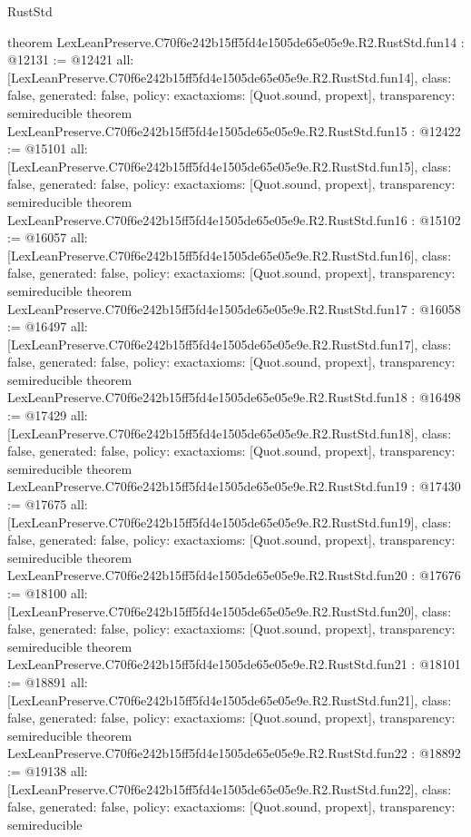 \begin{lexlean}{RustStd}
\begin{coremodule}
{}
theorem LexLeanPreserve.C70f6e242b15ff5fd4e1505de65e05e9e.R2.RustStd.fun14 : @12131 := @12421 {
  all: [LexLeanPreserve.C70f6e242b15ff5fd4e1505de65e05e9e.R2.RustStd.fun14],
  class: false,
  generated: false,
  policy: exact{axioms: [Quot.sound, propext]},
  transparency: semireducible
}
theorem LexLeanPreserve.C70f6e242b15ff5fd4e1505de65e05e9e.R2.RustStd.fun15 : @12422 := @15101 {
  all: [LexLeanPreserve.C70f6e242b15ff5fd4e1505de65e05e9e.R2.RustStd.fun15],
  class: false,
  generated: false,
  policy: exact{axioms: [Quot.sound, propext]},
  transparency: semireducible
}
theorem LexLeanPreserve.C70f6e242b15ff5fd4e1505de65e05e9e.R2.RustStd.fun16 : @15102 := @16057 {
  all: [LexLeanPreserve.C70f6e242b15ff5fd4e1505de65e05e9e.R2.RustStd.fun16],
  class: false,
  generated: false,
  policy: exact{axioms: [Quot.sound, propext]},
  transparency: semireducible
}
theorem LexLeanPreserve.C70f6e242b15ff5fd4e1505de65e05e9e.R2.RustStd.fun17 : @16058 := @16497 {
  all: [LexLeanPreserve.C70f6e242b15ff5fd4e1505de65e05e9e.R2.RustStd.fun17],
  class: false,
  generated: false,
  policy: exact{axioms: [Quot.sound, propext]},
  transparency: semireducible
}
theorem LexLeanPreserve.C70f6e242b15ff5fd4e1505de65e05e9e.R2.RustStd.fun18 : @16498 := @17429 {
  all: [LexLeanPreserve.C70f6e242b15ff5fd4e1505de65e05e9e.R2.RustStd.fun18],
  class: false,
  generated: false,
  policy: exact{axioms: [Quot.sound, propext]},
  transparency: semireducible
}
theorem LexLeanPreserve.C70f6e242b15ff5fd4e1505de65e05e9e.R2.RustStd.fun19 : @17430 := @17675 {
  all: [LexLeanPreserve.C70f6e242b15ff5fd4e1505de65e05e9e.R2.RustStd.fun19],
  class: false,
  generated: false,
  policy: exact{axioms: [Quot.sound, propext]},
  transparency: semireducible
}
theorem LexLeanPreserve.C70f6e242b15ff5fd4e1505de65e05e9e.R2.RustStd.fun20 : @17676 := @18100 {
  all: [LexLeanPreserve.C70f6e242b15ff5fd4e1505de65e05e9e.R2.RustStd.fun20],
  class: false,
  generated: false,
  policy: exact{axioms: [Quot.sound, propext]},
  transparency: semireducible
}
theorem LexLeanPreserve.C70f6e242b15ff5fd4e1505de65e05e9e.R2.RustStd.fun21 : @18101 := @18891 {
  all: [LexLeanPreserve.C70f6e242b15ff5fd4e1505de65e05e9e.R2.RustStd.fun21],
  class: false,
  generated: false,
  policy: exact{axioms: [Quot.sound, propext]},
  transparency: semireducible
}
theorem LexLeanPreserve.C70f6e242b15ff5fd4e1505de65e05e9e.R2.RustStd.fun22 : @18892 := @19138 {
  all: [LexLeanPreserve.C70f6e242b15ff5fd4e1505de65e05e9e.R2.RustStd.fun22],
  class: false,
  generated: false,
  policy: exact{axioms: [Quot.sound, propext]},
  transparency: semireducible
}
\end{coremodule}
\end{lexlean}
